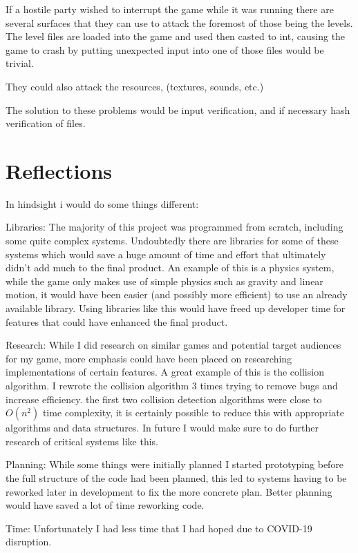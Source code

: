 \documentclass{article}
\begin{document}
If a hostile party wished to interrupt the game while it was running there are several surfaces that they can use to attack the foremost of those being the levels.
The level files are loaded into the game and used then casted to int, causing the game to crash by putting unexpected input into one of those files would be trivial.

They could also attack the resources, (textures, sounds, etc.)

The solution to these problems would be input verification, and if necessary hash verification of files.

\section{Reflections}

In hindsight i would do some things different:

Libraries: The majority of this project was programmed from scratch, including some quite complex systems. 
Undoubtedly there are libraries for some of these systems which would save a huge amount of time and effort that ultimately didn't add much to the final product.
An example of this is a physics system, while the game only makes use of simple physics such as gravity and linear motion, 
it would have been easier (and possibly more efficient) to use an already available library.
Using libraries like this would have freed up developer time for features that could have enhanced the final product.

Research: While I did research on similar games and potential target audiences for my game,
more emphasis could have been placed on researching implementations of certain features.
A great example of this is the collision algorithm. I rewrote the collision algorithm 3 times trying to remove bugs and increase efficiency.
the first two collision detection algorithms were close to $O(n^2)$ time complexity, it is certainly possible to reduce this with appropriate algorithms and data structures.
In future I would make sure to do further research of critical systems like this.

Planning: While some things were initially planned I started prototyping before the full structure of the code had been planned,
this led to systems having to be reworked later in development to fix the more concrete plan.
Better planning would have saved a lot of time reworking code.

Time: Unfortunately I had less time that I had hoped due to COVID-19 disruption.
\end{document}

